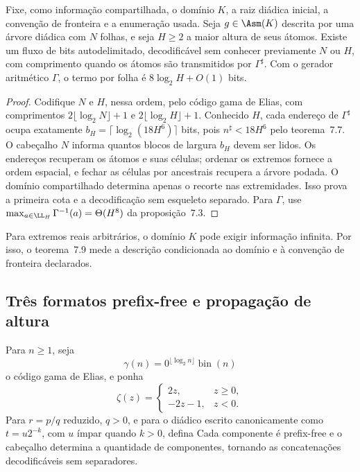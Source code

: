 \begin{teorema}
Fixe, como informação compartilhada, o domínio $K$, a raiz diádica inicial, a convenção de fronteira e a enumeração usada. Seja $g\in\Asm(K)$ descrita por uma árvore diádica com $N$ folhas, e seja $H\ge2$ a maior altura de seus átomos. Existe um fluxo de bits autodelimitado, decodificável sem conhecer previamente $N$ ou $H$, com comprimento
quando os átomos são transmitidos por $\Gamma^\sharp$. Com o gerador aritmético $\Gamma$, o termo por folha é $8\log_2H+O(1)$ bits.
\end{teorema}
\begin{proof}
Codifique $N$ e $H$, nessa ordem, pelo código gama de Elias, com comprimentos $2\lfloor\log_2N\rfloor+1$ e $2\lfloor\log_2H\rfloor+1$. Conhecido $H$, cada endereço de $\Gamma^\sharp$ ocupa exatamente $b_H=\lceil\log_2(18H^6)\rceil$ bits, pois $n^\sharp<18H^6$ pelo teorema~7.7. O cabeçalho $N$ informa quantos blocos de largura $b_H$ devem ser lidos. Os endereços recuperam os átomos e suas células; ordenar os extremos fornece a ordem espacial, e fechar as células por ancestrais recupera a árvore podada. O domínio compartilhado determina apenas o recorte nas extremidades. Isso prova a primeira cota e a decodificação sem esqueleto separado. Para $\Gamma$, use $\max_{a\in\LL_H}\Gamma^{-1}(a)=\Theta(H^8)$ da proposição~7.3.
\end{proof}
\begin{observacao}
Para extremos reais arbitrários, o domínio $K$ pode exigir informação infinita. Por isso, o teorema~7.9 mede a descrição condicionada ao domínio e à convenção de fronteira declarados.
\end{observacao}

\subsection{Três formatos prefix-free e propagação de altura}
Para $n\ge1$, seja
\[
\gamma(n)=0^{\lfloor\log_2n\rfloor}\operatorname{bin}(n)
\]
o código gama de Elias, e ponha
\[
\zeta(z)=\begin{cases}2z,&z\ge0,\\-2z-1,&z<0.\end{cases}
\]
Para $r=p/q$ reduzido, $q>0$, e para o diádico escrito canonicamente como $t=u2^{-k}$, com $u$ ímpar quando $k>0$, defina
Cada componente é prefix-free e o cabeçalho determina a quantidade de componentes, tornando as concatenações decodificáveis sem separadores.

